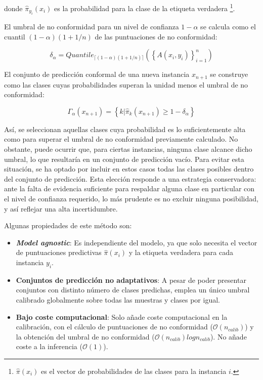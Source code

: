 donde $\hat{\pi}_{y_i}(x_i)$ es la probabilidad para la clase de la etiqueta verdadera%
\footnote{
    $\hat{\pi}(x_i)$ es el vector de probabilidades de las clases para la instancia $i$.
}.


El umbral de no conformidad para un nivel de confianza $1-\alpha$ se calcula como el cuantil 
$(1-\alpha)(1+1/n)$ de las puntuaciones de no conformidad:

$$
\delta_\alpha = Quantile_{ \lceil  (1-\alpha) (1 + 1/n)  \rceil } ( \left\{ A(x_i,y_i) \right\}_{i=1}^n)
$$

El conjunto de predicción conformal de una nueva instancia $x_{n+1}$ se construye como las clases cuyas probabilidades superan la unidad menos el umbral de no conformidad:

$$
\Gamma_\alpha(x_{n+1}) = \left\{ k | \hat{\pi}_k(x_{n+1}) \ge 1-\delta_\alpha \right\} 
$$

Así, se seleccionan aquellas clases cuya probabilidad es lo suficientemente alta como para superar el umbral de no conformidad previamente calculado. No obstante, puede ocurrir que, para ciertas instancias, ninguna clase alcance dicho umbral, lo que resultaría en un conjunto de predicción vacío. Para evitar esta situación, se ha optado por incluir en estos casos todas las clases posibles dentro del conjunto de predicción. Esta elección responde a una estrategia conservadora: ante la falta de evidencia suficiente para respaldar alguna clase en particular con el nivel de confianza requerido, lo más prudente es no excluir ninguna posibilidad, y así reflejar una alta incertidumbre. 

Algunas propiedades de este método son:

\begin{itemize}

    \item \textbf{\textit{Model agnostic}}: Es independiente del modelo, ya que solo necesita el vector de puntuaciones predictivas $\hat{\pi}(x_i)$ y la etiqueta verdadera para cada instancia $y_i$.  

    \item \textbf{Conjuntos de predicción no adaptativos}: A pesar de poder presentar conjuntos con distinto número de clases predichas, emplea un único umbral calibrado globalmente sobre todas las muestras y clases por igual. 

    \item \textbf{Bajo coste computacional}: Solo añade coste computacional en la calibración, con el cálculo de puntuaciones de no conformidad ($\mathcal{O}(n_{calib})$) y la obtención del umbral de no conformidad ($\mathcal{O}(n_{calib})log n_{calib}$). No añade coste a la inferencia ($\mathcal{O}(1)$).
    
\end{itemize}

